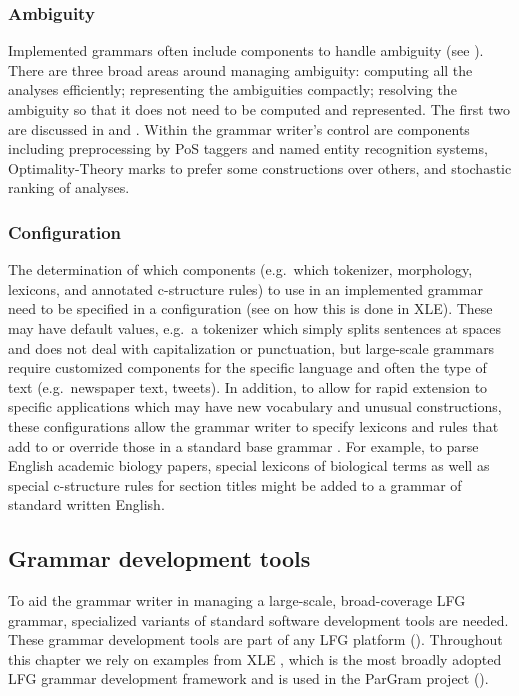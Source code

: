 \documentclass[output=paper,hidelinks]{langscibook}
\begin{document}
\subsubsection{Ambiguity} Implemented grammars often include components to handle ambiguity (see ). There are three broad areas around  managing ambiguity: computing all the analyses efficiently; representing the ambiguities compactly; resolving the ambiguity so that it does not need to be computed and represented. The first two are discussed in   and . Within the grammar writer's control are components including preprocessing by PoS taggers and named entity recognition systems, Optimality-Theory marks to prefer some constructions over others, and stochastic ranking of analyses.

\subsubsection{Configuration} The determination of which components (e.g.\ which tokenizer, morphology, lexicons, and annotated c-structure rules) to use in an implemented grammar need to be specified in a configuration (see \cite{xledoc} on how this is done in XLE). These may have default values, e.g.\ a tokenizer which simply splits sentences at spaces and does not deal with capitalization or punctuation, but large-scale grammars require customized components for the specific language and often the type of text (e.g.\ newspaper text, tweets). In addition, to allow for rapid extension to specific applications which may have new vocabulary and unusual constructions, these configurations allow the grammar writer to specify lexicons and rules that add to or override those in a standard base grammar \citep{kingmaxwell07}. For example, to parse English academic biology papers, special lexicons of biological terms as well as special c-structure rules for section titles might be added to a grammar of standard written English.

% 
\subsection{Grammar development tools}
 \label{sec:devtools}
 
 To aid the grammar writer in managing a large-scale, broad-coverage LFG grammar, specialized variants of standard software development tools are needed. These grammar development tools are part of any LFG platform (). Throughout this chapter we rely on examples from XLE \citep{xledoc}, which is the most broadly adopted LFG grammar development framework and is used in the ParGram project ().
 
\end{document}
